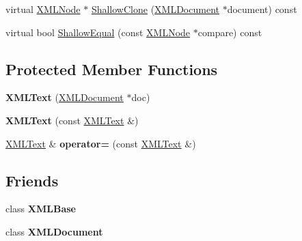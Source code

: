 \begin{DoxyCompactItemize}
\item 
virtual \hyperlink{classtinyxml2_1_1_x_m_l_node}{X\-M\-L\-Node} $\ast$ \hyperlink{classtinyxml2_1_1_x_m_l_text_af5115f8cc83de2947ed6a9d13e2f88c8}{Shallow\-Clone} (\hyperlink{classtinyxml2_1_1_x_m_l_document}{X\-M\-L\-Document} $\ast$document) const 
\item 
virtual bool \hyperlink{classtinyxml2_1_1_x_m_l_text_a1588aa5d23cb21eb31f36df0aaaa8d66}{Shallow\-Equal} (const \hyperlink{classtinyxml2_1_1_x_m_l_node}{X\-M\-L\-Node} $\ast$compare) const 
\end{DoxyCompactItemize}
\subsection*{Protected Member Functions}
\begin{DoxyCompactItemize}
\item 
\hypertarget{classtinyxml2_1_1_x_m_l_text_ad9f46d70e61e5386ead93728d8b90267}{{\bfseries X\-M\-L\-Text} (\hyperlink{classtinyxml2_1_1_x_m_l_document}{X\-M\-L\-Document} $\ast$doc)}\label{classtinyxml2_1_1_x_m_l_text_ad9f46d70e61e5386ead93728d8b90267}

\item 
\hypertarget{classtinyxml2_1_1_x_m_l_text_a002156e1f61ee6d48e5368b7cca25582}{{\bfseries X\-M\-L\-Text} (const \hyperlink{classtinyxml2_1_1_x_m_l_text}{X\-M\-L\-Text} \&)}\label{classtinyxml2_1_1_x_m_l_text_a002156e1f61ee6d48e5368b7cca25582}

\item 
\hypertarget{classtinyxml2_1_1_x_m_l_text_ad8c9f398d92fa472e213b89d8483ae8f}{\hyperlink{classtinyxml2_1_1_x_m_l_text}{X\-M\-L\-Text} \& {\bfseries operator=} (const \hyperlink{classtinyxml2_1_1_x_m_l_text}{X\-M\-L\-Text} \&)}\label{classtinyxml2_1_1_x_m_l_text_ad8c9f398d92fa472e213b89d8483ae8f}

\end{DoxyCompactItemize}
\subsection*{Friends}
\begin{DoxyCompactItemize}
\item 
\hypertarget{classtinyxml2_1_1_x_m_l_text_a449202cfc89e7ae5c2f81995476f9ec1}{class {\bfseries X\-M\-L\-Base}}\label{classtinyxml2_1_1_x_m_l_text_a449202cfc89e7ae5c2f81995476f9ec1}

\item 
\hypertarget{classtinyxml2_1_1_x_m_l_text_a4eee3bda60c60a30e4e8cd4ea91c4c6e}{class {\bfseries X\-M\-L\-Document}}\label{classtinyxml2_1_1_x_m_l_text_a4eee3bda60c60a30e4e8cd4ea91c4c6e}

\end{DoxyCompactItemize}
